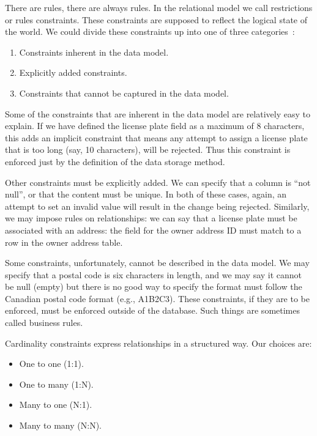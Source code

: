 There are rules, there are always rules. In the relational model we call restrictions or rules constraints. These constraints are supposed to reflect the logical state of the world. We could divide these constraints up into one of three categories~\cite{fds}:

\begin{enumerate}
\item Constraints inherent in the data model.
\item Explicitly added constraints.
\item Constraints that cannot be captured in the data model. 
\end{enumerate}

Some of the constraints that are inherent in the data model are relatively easy to explain. If we have defined the license plate field as a maximum of 8 characters, this adds an implicit constraint that means any attempt to assign a license plate that is too long (say, 10 characters), will be rejected. Thus this constraint is enforced just by the definition of the data storage method.

Other constraints must be explicitly added. We can specify that a column is ``not null'', or that the content must be unique. In both of these cases, again, an attempt to set an invalid value will result in the change being rejected. Similarly, we may impose rules on relationships: we can say that a license plate must be associated with an address: the field for the owner address ID must match to a row in the owner address table.

Some constraints, unfortunately, cannot be described in the data model. We may specify that a postal code is six characters in length, and we may say it cannot be null (empty) but there is no good way to specify the format must follow the Canadian postal code format (e.g., A1B2C3). These constraints, if they are to be enforced, must be enforced outside of the database. Such things are sometimes called business rules.

Cardinality constraints express relationships in a structured way. Our choices are:

\begin{itemize}
\item One to one (1:1).
\item One to many (1:N).
\item Many to one (N:1).
\item Many to many (N:N).
\end{itemize}

